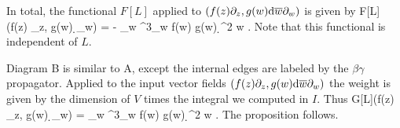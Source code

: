 In total, the functional $F[L]$ applied to $(f(z) \partial_z, g(w) {\rm d} \overline{w} \partial_w)$ is given by
\ben
F[L] (f(z) \partial_z, g(w) \d \wbar \partial_w) = -   \int_{w \in \CC}  \partial^3_w f(w) g(w) \d^2 w .
\een
Note that this functional is independent of $L$. 

Diagram B is similar to A, except the internal edges are labeled by the $\beta\gamma$ propagator. 
Applied to the input vector fields $(f(z) \partial_z, g(w) {\rm d} \overline{w} \partial_w)$ the weight is given by the dimension of $V$ times the integral we computed in $I$.
Thus
\ben
G[L](f(z) \partial_z, g(w) \d \wbar \partial_w) =   \int_{w\in \CC} \partial^3_w f(w) g(w) \d^2 w .
\een
The proposition follows.
